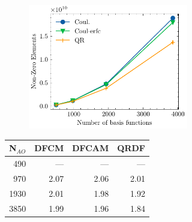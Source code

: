
%
\begin{figure}[htp]

\begin{subfigure}{\textwidth}
\begin{subfigure}{0.45\textwidth}
\includegraphics[width=\textwidth]{Pics/cfit_nze_alkan}
\end{subfigure}
\hfill
\begin{subtable}{0.45\textwidth}
\begin{tabular}{rrrr}
\hline
N$_{AO}$ & DFCM & DFCAM & QRDF \\ \hline
490 & --- & --- & --- \\ 
970 & 2.07 & 2.06 & 2.01 \\ 
1930 & 2.01 & 1.98 & 1.92 \\ 
3850 & 1.99 & 1.96 & 1.84 \\ \hline
\end{tabular}
\end{subtable}
\caption{}
\label{fig:GS_MBNZE_LA}
\end{subfigure}

\vspace{1.5\baselineskip}


\end{figure}
